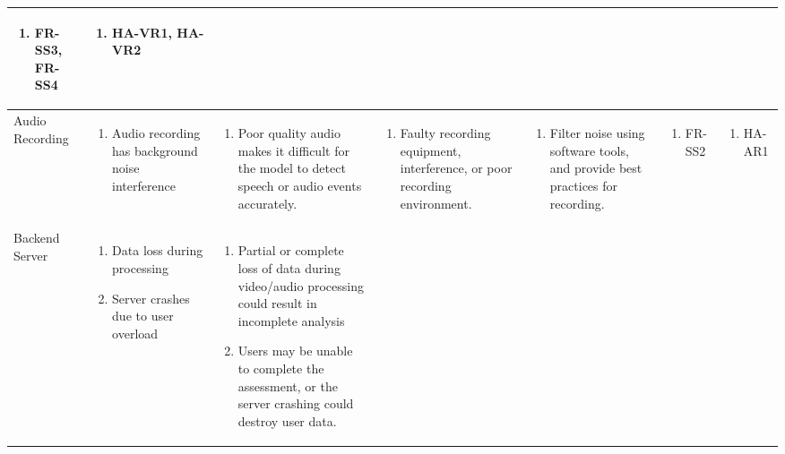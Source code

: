\documentclass{article}
\begin{document}
\begin{landscape}
\begin{longtable}{|p{3cm}|p{3cm}|p{4cm}|p{4cm}|p{3cm}|p{2cm}|p{3cm}|}
  \begin{enumerate}[leftmargin=*]
       \item FR-SS3, FR-SS4
  \end{enumerate} &
  \begin{enumerate}[leftmargin=*]
       \item HA-VR1, HA-VR2
  \end{enumerate} \\
  \hline
  Audio Recording  & 
  \begin{enumerate}[leftmargin=*]
      \item Audio recording has background noise interference
  \end{enumerate} & 
  \begin{enumerate}[leftmargin=*]
      \item Poor quality audio makes it difficult for the model to detect speech or audio events accurately.
  \end{enumerate} &
  \begin{enumerate}[leftmargin=*]
       \item Faulty recording equipment, interference, or poor recording environment.
  \end{enumerate} &
  \begin{enumerate}[leftmargin=*]
       \item Filter noise using software tools, and provide best practices for recording.
  \end{enumerate} &
  \begin{enumerate}[leftmargin=*]
       \item FR-SS2
  \end{enumerate} &
  \begin{enumerate}[leftmargin=*]
       \item HA-AR1
  \end{enumerate} \\
  \hline
  Backend Server & 
  \begin{enumerate}[leftmargin=*]
      \item Data loss during processing
      \item Server crashes due to user overload
  \end{enumerate} & 
  \begin{enumerate}[leftmargin=*]
      \item Partial or complete loss of data during video/audio processing could result in incomplete analysis
      \item Users may be unable to complete the assessment, or the server crashing could destroy user data.

\end{enumerate}
\end{longtable}
\end{landscape}
\end{document}
